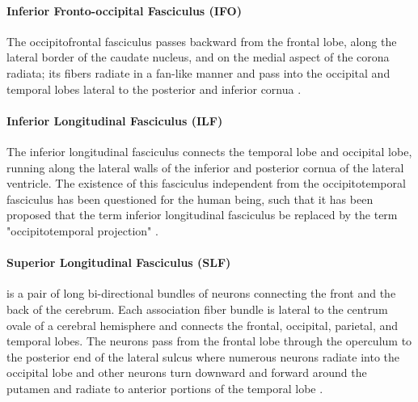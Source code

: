\documentclass[../structure.tex]{subfiles}
\begin{document}
		\paragraph{Inferior Fronto-occipital Fasciculus (IFO)}
		The occipitofrontal fasciculus passes backward from the frontal lobe, along the lateral border of the caudate nucleus, and on the medial aspect of the corona radiata; its fibers radiate in a fan-like manner and pass into the occipital and temporal lobes lateral to the posterior and inferior cornua \cite{PDD2015}.
		\paragraph{Inferior Longitudinal Fasciculus (ILF)}
		The inferior longitudinal fasciculus connects the temporal lobe and occipital lobe, running along the lateral walls of the inferior and posterior cornua of the lateral ventricle.
The existence of this fasciculus independent from the occipitotemporal fasciculus has been questioned for the human being, such that it has been proposed that the term inferior longitudinal fasciculus be replaced by the term "occipitotemporal projection" \cite{PDD2015}.
		\paragraph{Superior Longitudinal Fasciculus (SLF)}
		is a pair of long bi-directional bundles of neurons connecting the front and the back of the cerebrum. Each association fiber bundle is lateral to the centrum ovale of a cerebral hemisphere and connects the frontal, occipital, parietal, and temporal lobes. The neurons pass from the frontal lobe through the operculum to the posterior end of the lateral sulcus where numerous neurons radiate into the occipital lobe and other neurons turn downward and forward around the putamen and radiate to anterior portions of the temporal lobe \cite{PDD2015}.
		
\end{document}
